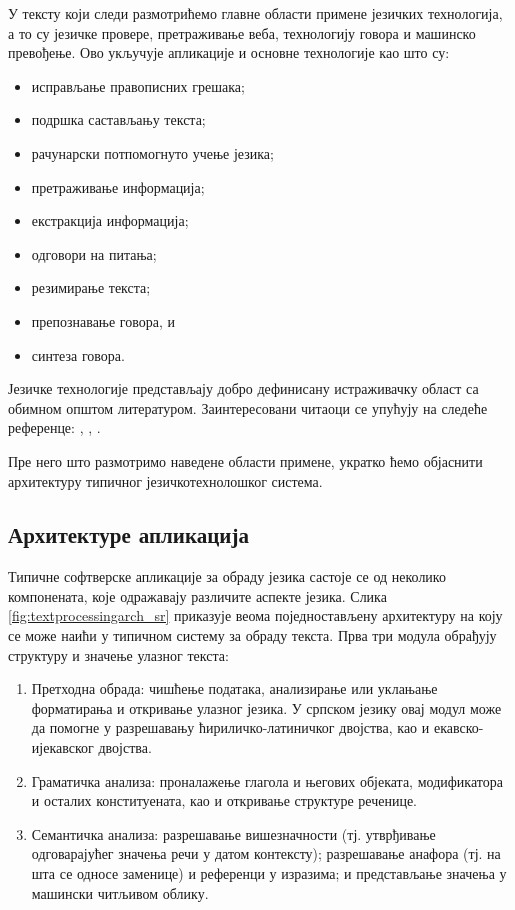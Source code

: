 \begin{multicols}{2}
У тексту који следи размотрићемо главне области примене језичких технологија, а то су  језичке провере, претраживање веба, технологију говора и машинско превођење. Ово укључује апликације и основне технологије као што су:
\begin{itemize}
 \item исправљање правописних грешака;
 \item подршка састављању текста;
 \item рачунарски потпомогнуто учење језика;
 \item претраживање информација;
\item  екстракција информација;
 \item одговори на питања;
\item резимирање текста;
\item препознавање говора, и
\item  синтеза говора.
\end{itemize}
Језичке технологије представљају добро дефинисану истраживачку област са обимном општом литературом. Заинтересовани читаоци се упућују на следеће референце:  \cite{jurafsky-martin01},  \cite{manning-schuetze1},  \cite{lt-survey1}.

Пре него што размотримо наведене  области примене,  укратко ћемо објаснити архитектуру типичног језичкотехнолошког система.

 \subsection {Архитектуре апликација}
   
Типичне софтверске апликације за обраду језика састоје се од неколико компонената, које одражавају различите аспекте језика. Слика \ref{fig:textprocessingarch_sr} приказује веома поједностављену архитектуру на коју се може наићи у типичном систему за обраду текста. Прва три модула обрађују структуру и значење улазног текста:

\begin{enumerate}
\item Претходна обрада: чишћење података, анализирање или уклањање форматирања и откривање улазног језика. У српском језику овај модул може да помогне у разрешавању ћириличко-латиничког двојства, као и екавско-ијекавског двојства. 
\item Граматичка анализа: проналажење глагола и његових објеката, модификатора и осталих конституената, као и откривање структуре реченице. 
\item Семантичка анализа: разрешавање вишезначности (тј. утврђивање одговарајућег значења речи у датом контексту); разрешавање анафора (тј. на шта се односе заменице) и референци у изразима; и представљање значења у машински читљивом облику.
\end{enumerate}


\end{multicols}
